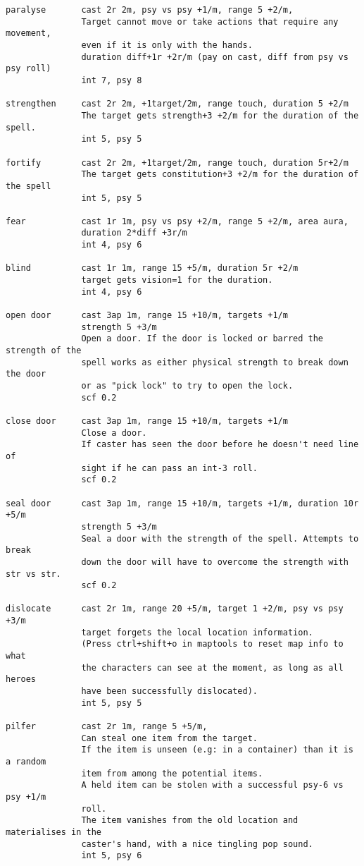 \begin{verbatim}
paralyse       cast 2r 2m, psy vs psy +1/m, range 5 +2/m,
               Target cannot move or take actions that require any movement,
               even if it is only with the hands.
               duration diff+1r +2r/m (pay on cast, diff from psy vs psy roll)
               int 7, psy 8

strengthen     cast 2r 2m, +1target/2m, range touch, duration 5 +2/m
               The target gets strength+3 +2/m for the duration of the spell.
               int 5, psy 5

fortify        cast 2r 2m, +1target/2m, range touch, duration 5r+2/m
               The target gets constitution+3 +2/m for the duration of the spell
               int 5, psy 5

fear           cast 1r 1m, psy vs psy +2/m, range 5 +2/m, area aura,
               duration 2*diff +3r/m
               int 4, psy 6

blind          cast 1r 1m, range 15 +5/m, duration 5r +2/m
               target gets vision=1 for the duration.
               int 4, psy 6

open door      cast 3ap 1m, range 15 +10/m, targets +1/m
               strength 5 +3/m
               Open a door. If the door is locked or barred the strength of the
               spell works as either physical strength to break down the door
               or as "pick lock" to try to open the lock.
               scf 0.2

close door     cast 3ap 1m, range 15 +10/m, targets +1/m
               Close a door.
               If caster has seen the door before he doesn't need line of 
               sight if he can pass an int-3 roll.
               scf 0.2

seal door      cast 3ap 1m, range 15 +10/m, targets +1/m, duration 10r +5/m
               strength 5 +3/m
               Seal a door with the strength of the spell. Attempts to break
               down the door will have to overcome the strength with str vs str.
               scf 0.2

dislocate      cast 2r 1m, range 20 +5/m, target 1 +2/m, psy vs psy +3/m
               target forgets the local location information.
               (Press ctrl+shift+o in maptools to reset map info to what
               the characters can see at the moment, as long as all heroes
               have been successfully dislocated).
               int 5, psy 5

pilfer         cast 2r 1m, range 5 +5/m,
               Can steal one item from the target.
               If the item is unseen (e.g: in a container) than it is a random
               item from among the potential items.
               A held item can be stolen with a successful psy-6 vs psy +1/m
               roll.
               The item vanishes from the old location and materialises in the
               caster's hand, with a nice tingling pop sound.
               int 5, psy 6


\end{verbatim}
